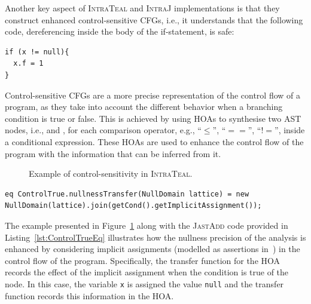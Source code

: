 Another key aspect of \textsc{IntraTeal} and \textsc{IntraJ} implementations is that they
construct enhanced control-sensitive CFGs, i.e., it understands that the following code, 
dereferencing  inside the body of the if-statement, is safe:
\begin{lstlisting}[language=JastAdd]
if (x != null){
  x.f = 1
}
\end{lstlisting}
Control-sensitive CFGs are a more precise representation of the control flow of a program, as they take
into account the different behavior when a branching condition is true or false. This is achieved by
using HOAs to synthesise two AST nodes, i.e.,  and , for each
comparison operator, e.g.,  ``$\le$'', ``$==$'', ``$!=$'', inside a conditional expression.
These HOAs are used to enhance the control flow of the program with the information that can be inferred from
it. 
\begin{figure}
	\centering
	\caption{\label{fig:ExampleTEAL} Example of control-sensitivity in \textsc{IntraTeal}.}
\end{figure}
\begin{lstlisting}[language=JastAdd,label={lst:ControlTrueEq}, caption={Transfer function for \astnode{ControlTrue} HOA.}]
eq ControlTrue.nullnessTransfer(NullDomain lattice) = new NullDomain(lattice).join(getCond().getImplicitAssignment());
\end{lstlisting}
The example presented in Figure~\ref{fig:ExampleTEAL} along with the \textsc{JastAdd} code
provided in Listing~\ref{lst:ControlTrueEq} illustrates how the nullness precision of the
analysis is enhanced by considering implicit assignments (modelled as assertions in~\cite{spa}) in the control flow of
the program. Specifically, the transfer function for the  HOA
records the effect of the implicit assignment when the condition is true of the  node.
In this case, the variable \texttt{x} is assigned the value \texttt{null} and the transfer function
records this information in the  HOA.

